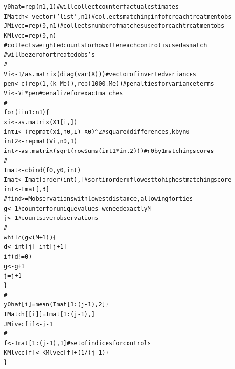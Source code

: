 \documentclass[11pt,reqno]{amsart}\usepackage[]{graphicx}\usepackage[]{color}
\makeatletter
\newcommand{\hlnum}[1]{\textcolor[rgb]{0.063,0.58,0.627}{#1}}%
\newcommand{\hlstr}[1]{\textcolor[rgb]{0.063,0.58,0.627}{#1}}%
\newcommand{\hlcom}[1]{\textcolor[rgb]{0.588,0.588,0.588}{#1}}%
\newcommand{\hlopt}[1]{\textcolor[rgb]{0.196,0.196,0.196}{#1}}%
\newcommand{\hlstd}[1]{\textcolor[rgb]{0.196,0.196,0.196}{#1}}%
\newcommand{\hlkwa}[1]{\textcolor[rgb]{0.231,0.416,0.784}{#1}}%
\newcommand{\hlkwb}[1]{\textcolor[rgb]{0.627,0,0.314}{#1}}%
\newcommand{\hlkwd}[1]{\textcolor[rgb]{0.78,0.227,0.412}{#1}}%
\newenvironment{kframe}{%
 \def\at@end@of@kframe{}%
 \ifinner\ifhmode%
  \def\at@end@of@kframe{\end{minipage}}%
  \begin{minipage}{\columnwidth}%
 \fi\fi%
 \def\FrameCommand##1{\hskip\@totalleftmargin \hskip-\fboxsep
 \colorbox{shadecolor}{##1}\hskip-\fboxsep
     \hskip-\linewidth \hskip-\@totalleftmargin \hskip\columnwidth}%
 \MakeFramed {\advance\hsize-\width
   \@totalleftmargin\z@ \linewidth\hsize
   \@setminipage}}%
 {\par\unskip\endMakeFramed%
 \at@end@of@kframe}
\makeatother
\begin{document}
\begin{enumerate}
\begin{kframe}
\begin{alltt}
\hlstd{y0hat} \hlkwb{=} \hlkwd{rep}\hlstd{(n1,} \hlnum{1}\hlstd{)}  \hlcom{# will collect counterfactual estimates}
\hlstd{IMatch} \hlkwb{<-} \hlkwd{vector}\hlstd{(}\hlstr{'list'}\hlstd{, n1)} \hlcom{#collects matching info for each treatment obs}
\hlstd{JMivec} \hlkwb{=} \hlkwd{rep}\hlstd{(}\hlnum{0}\hlstd{, n1)} \hlcom{#collects number of matches used for each treatment obs}
\hlstd{KMlvec} \hlkwb{=} \hlkwd{rep}\hlstd{(}\hlnum{0}\hlstd{, n)}
\hlcom{#collects weighted counts for how often each control is used as match}
\hlcom{# will be zero for treated obs's}
\hlcom{#}
\hlstd{Vi} \hlkwb{<-} \hlnum{1} \hlopt{/} \hlkwd{as.matrix}\hlstd{(}\hlkwd{diag}\hlstd{(}\hlkwd{var}\hlstd{(X)))} \hlcom{#vector of inverted variances}
\hlstd{pen} \hlkwb{<-} \hlkwd{c}\hlstd{(}\hlkwd{rep}\hlstd{(}\hlnum{1}\hlstd{, (k} \hlopt{-} \hlstd{Me)),} \hlkwd{rep}\hlstd{(}\hlnum{1000}\hlstd{, Me))}\hlcom{# penalties for variance terms}
\hlstd{Vi} \hlkwb{<-} \hlstd{Vi} \hlopt{*} \hlstd{pen}  \hlcom{#penalize for exact matches}
\hlcom{#}
\hlkwa{for} \hlstd{(i} \hlkwa{in} \hlnum{1}\hlopt{:}\hlstd{n1) \{}
  \hlstd{xi} \hlkwb{<-} \hlkwd{as.matrix}\hlstd{(X1[i, ])}
  \hlstd{int1} \hlkwb{<-} \hlstd{(}\hlkwd{repmat}\hlstd{(xi, n0,} \hlnum{1}\hlstd{)} \hlopt{-} \hlstd{X0)} \hlopt{^} \hlnum{2} \hlcom{#squared differences, k by n0}
  \hlstd{int2} \hlkwb{<-} \hlkwd{repmat}\hlstd{(Vi, n0,} \hlnum{1}\hlstd{)}
  \hlstd{int} \hlkwb{<-} \hlkwd{as.matrix}\hlstd{(}\hlkwd{sqrt}\hlstd{(}\hlkwd{rowSums}\hlstd{(int1} \hlopt{*} \hlstd{int2)))} \hlcom{#n0 by 1 matching scores}
  \hlcom{#}
  \hlstd{Imat} \hlkwb{<-} \hlkwd{cbind}\hlstd{(f0, y0, int)}
  \hlstd{Imat} \hlkwb{<-} \hlstd{Imat[}\hlkwd{order}\hlstd{(int), ]} \hlcom{#sort in order of lowest to highest matching score}
  \hlstd{int} \hlkwb{<-} \hlstd{Imat[,} \hlnum{3}\hlstd{]}
  \hlcom{#find >= M observations with lowest distance, allowing for ties}
  \hlstd{g} \hlkwb{<-} \hlnum{1} \hlcom{#counter for unique values - we need exactly M}
  \hlstd{j} \hlkwb{<-} \hlnum{1} \hlcom{#counts over observations}
  \hlcom{#}
  \hlkwa{while} \hlstd{(g} \hlopt{<} \hlstd{(M} \hlopt{+} \hlnum{1}\hlstd{)) \{}
    \hlstd{d} \hlkwb{<-} \hlstd{int[j]} \hlopt{-} \hlstd{int[j} \hlopt{+} \hlnum{1}\hlstd{]}
    \hlkwa{if} \hlstd{(d} \hlopt{!=} \hlnum{0}\hlstd{)}
      \hlstd{g} \hlkwb{<-} \hlstd{g} \hlopt{+} \hlnum{1}
    \hlstd{j} \hlkwb{=} \hlstd{j} \hlopt{+} \hlnum{1}
  \hlstd{\}}
  \hlcom{#}
  \hlstd{y0hat[i]} \hlkwb{=} \hlkwd{mean}\hlstd{(Imat[}\hlnum{1}\hlopt{:}\hlstd{(j} \hlopt{-} \hlnum{1}\hlstd{),} \hlnum{2}\hlstd{])}
  \hlstd{IMatch[[i]]} \hlkwb{=} \hlstd{Imat[}\hlnum{1}\hlopt{:}\hlstd{(j} \hlopt{-} \hlnum{1}\hlstd{),]}
  \hlstd{JMivec[i]} \hlkwb{<-} \hlstd{j} \hlopt{-} \hlnum{1}
  \hlcom{#}
  \hlstd{f} \hlkwb{<-} \hlstd{Imat[}\hlnum{1}\hlopt{:}\hlstd{(j} \hlopt{-} \hlnum{1}\hlstd{),} \hlnum{1}\hlstd{]} \hlcom{#set of indices for controls}
  \hlstd{KMlvec[f]} \hlkwb{<-} \hlstd{KMlvec[f]} \hlopt{+} \hlstd{(}\hlnum{1} \hlopt{/} \hlstd{(j} \hlopt{-} \hlnum{1}\hlstd{))}
\hlstd{\}}
\end{alltt}
\end{kframe}


\end{enumerate}
\end{document}
